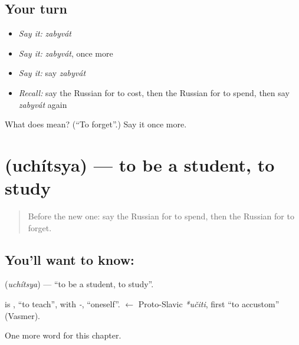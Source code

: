 \subsection*{Your turn}
\begin{itemize}
\raggedright
  \item \emph{Say it:} \emph{zabyvát}
  \item \emph{Say it:} \emph{zabyvát}, once more
  \item \emph{Say it:} say \emph{zabyvát}
  \item \emph{Recall:} say the Russian for to cost, then the Russian for to spend, then say \emph{zabyvát} again
\end{itemize}

\begin{tcolorbox}[breakable,colback=teal!4,colframe=teal!35!black,title={Before you move on}]
What does  mean? (\textquotedblleft{}To forget\textquotedblright{}.) Say it once more.
\end{tcolorbox}
\section[\texorpdfstring{\ru{учиться} (uchítsya)}{учиться (uchítsya)}]{ (uchítsya) — to be a student, to study}

\label{lesson:RU-C205-uchitsya}



\begin{quote}
Before the new one: say the Russian for to spend, then the Russian for to forget.
\end{quote}

\subsection*{You'll want to know: }
\textbf{} (\emph{uchítsya}) — \textquotedblleft{}to be a student, to study\textquotedblright{}.

\begin{cousinweb}
\textbf{} is \emph{}, \textquotedblleft{}to teach\textquotedblright{}, with \emph{-}, \textquotedblleft{}oneself\textquotedblright{}. \emph{} $\leftarrow$ Proto-Slavic \emph{*učiti}, first \textquotedblleft{}to accustom\textquotedblright{} (Vasmer).
\end{cousinweb}

\begin{grammarlens}[title={What you've built}]
One more word for this chapter.
\end{grammarlens}

